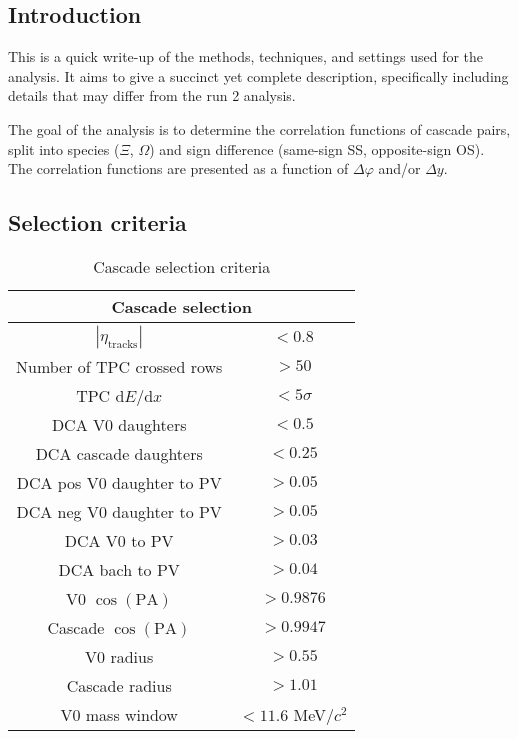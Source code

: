 \subsection{Introduction}
    This is a quick write-up of the methods, techniques, and settings used for the analysis. It aims to give a succinct yet complete description, specifically including details that may differ from the run 2 analysis.
    
    The goal of the analysis is to determine the correlation functions of cascade pairs, split into species ($\Xi$, $\Omega$) and sign difference (same-sign SS, opposite-sign OS). The correlation functions are presented as a function of $\Delta\varphi$ and/or $\Delta y$. 


\subsection{Selection criteria}
    \begin{table}[h]
        \centering
        \begin{tabular}{|c|c|}
            \hline
            \multicolumn{2}{|c|}{Cascade selection} \\
            \hline
            $|\eta_\text{tracks}|$ & $< 0.8$ \\
            \hline
            Number of TPC crossed rows & $> 50$ \\
            \hline
            TPC d$E$/d$x$ & $< 5\sigma$ \\
            \hline
            DCA V0 daughters & $< 0.5$ \\
            \hline
            DCA cascade daughters & $< 0.25$ \\
            \hline
            DCA pos V0 daughter to PV & $> 0.05$ \\
            \hline
            DCA neg V0 daughter to PV & $> 0.05$ \\
            \hline
            DCA V0 to PV & $> 0.03$ \\
            \hline
            DCA bach to PV & $> 0.04$ \\
            \hline
            V0 $\cos(\text{PA})$ & $> 0.9876$ \\
            \hline
            Cascade $\cos(\text{PA})$ & $> 0.9947$ \\
            \hline
            V0 radius & $> 0.55$ \\
            \hline
            Cascade radius & $> 1.01$ \\
            \hline
            V0 mass window & $< 11.6$ MeV/$c^2$\\
            \hline
            
        \end{tabular}
        \caption{Cascade selection criteria}
        \label{tab:cascsel}
    \end{table}

